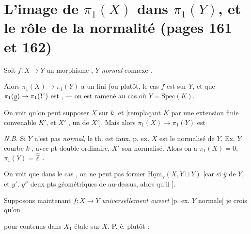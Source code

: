 \documentclass[11pt,a4paper]{article}
\begin{document}
\section*{L'image de $\pi_1(X)$ dans $\pi_1(Y)$, et le rôle de la normalité (pages 161 et 162)}


Soit $f : X \to Y$ un morphisme  , $Y$
\emph{normal} connexe .

Alors $\pi_1(X) \to \pi_1(Y)$ a un  fini (ou plutôt,
\ill{} le cas  $f$ est  \ill{} sur $Y$,
et  que $\pi_1(\uncertain{y}) \to \pi_1(Y)$ est
, --- on est ramené au cas où $Y = \mathrm{Spec}(K)$.

On voit \ill{} qu'on peut supposer $X$ \ill{} sur $k$, et
\ill{} [remplaçant $K$ par une extension  finie
convenable $K'$, et   $X'$ \ill{}
 \ill{}, \ill{} un
 de $X'$]. Mais alors $\pi_1(X) \to \pi_1(Y)$ est
\ill{}

\emph{N.B.} Si $Y$ n'est pas \emph{normal}, le th. est faux,
 p. ex. $X$ est le normalisé de $Y$. Ex. $Y$ courbe
 $k$ , avec pt double ordinaire, $X'$
son normalisé. Alors on a $\pi_1(X) = 0$, $\pi_1(Y) = \widehat{\mathbb{Z}}$
.

On voit  que dans le  cas \ill{}, on
ne peut pas former $\underline{\mathrm{Hom}}_Y(X, Y \sqcup Y)$ [car si
 $\overline{y}$ \ill{} de $Y$, et $y'$, $y''$ deux pts
géométriques de \ill{} au-dessus, alors qu'il \ill{}].

Supposons maintenant \ill{} $f : X \to Y$ \emph{universellement ouvert}
[p. ex. $Y$ normale] je crois qu'on


pour  \ill{} contenus dans $X_1$ étale sur $X$.
P.-ê. plutôt :


\end{document}
